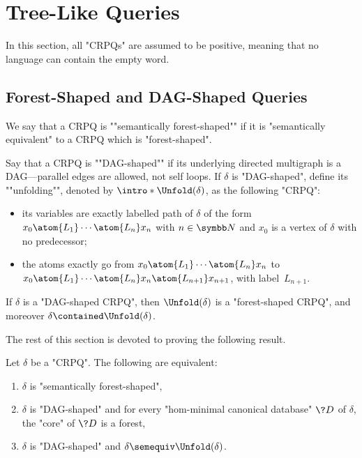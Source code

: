 \section{Tree-Like Queries}

\begin{hypothesis}
	 In this section, all "CRPQs" are assumed to be positive, meaning
	that no language can contain the empty word.
\end{hypothesis}

\subsection{Forest-Shaped and DAG-Shaped Queries}

We say that a CRPQ is \AP""semantically forest-shaped"" if it is
"semantically equivalent" to a CRPQ which is "forest-shaped".

Say that a CRPQ is \AP""DAG-shaped"" if its underlying directed multigraph
is a DAG---parallel edges are allowed, not self loops. If $\delta$ is "DAG-shaped",
define its \AP""unfolding"", denoted by \AP$\intro*\Unfold(\delta)$, as the following "CRPQ":
\begin{itemize}
	\item its variables are exactly labelled path of $\delta$
	of the form $x_0 \atom{L_1} \cdots \atom{L_n} x_n$ with $n\in \N$
	and $x_0$ is a vertex of $\delta$ with no predecessor;
	\item the atoms exactly go from $x_0 \atom{L_1} \cdots \atom{L_n} x_n$
	to $x_0 \atom{L_1} \cdots \atom{L_n} x_n \atom{L_{n+1}} x_{n+1}$,
	with label~$L_{n+1}$.
\end{itemize}

\begin{fact}
	\AP\label{fact:unfolding-is-forest}
	If $\delta$ is a "DAG-shaped CRPQ", then $\Unfold(\delta)$ is a "forest-shaped CRPQ",
	and moreover $\delta \contained \Unfold(\delta)$.
\end{fact}

The rest of this section is devoted to proving the following result.

\begin{theorem}
	\AP\label{thm:charac-semantically-forest-shaped}
	Let $\delta$ be a "CRPQ". The following are equivalent:
	\begin{enumerate}
		\item $\delta$ is "semantically forest-shaped",
		\item $\delta$ is "DAG-shaped" and
			for every "hom-minimal canonical database" $\?D$ of $\delta$, the "core" of $\?D$ is a forest,
		\item $\delta$ is "DAG-shaped" and $\delta \semequiv \Unfold(\delta)$. 
	\end{enumerate}
\end{theorem}

